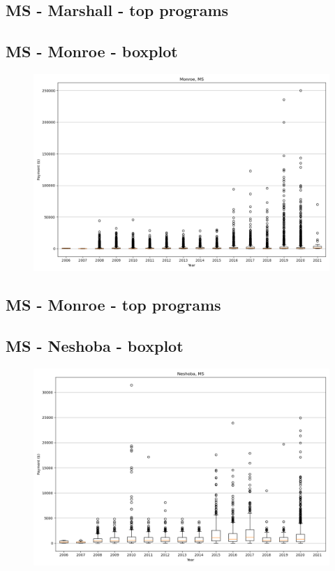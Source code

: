 \subsection*{MS - Marshall - top programs}

\newpage
\subsection*{MS - Monroe - boxplot}
\begin{figure}[h]
\centering
\includegraphics[width=7in]{../output/boxplots/counties/Monroe-MS_boxplot.png}
\end{figure}


\subsection*{MS - Monroe - top programs}

\newpage
\subsection*{MS - Neshoba - boxplot}
\begin{figure}[h]
\centering
\includegraphics[width=7in]{../output/boxplots/counties/Neshoba-MS_boxplot.png}
\end{figure}


